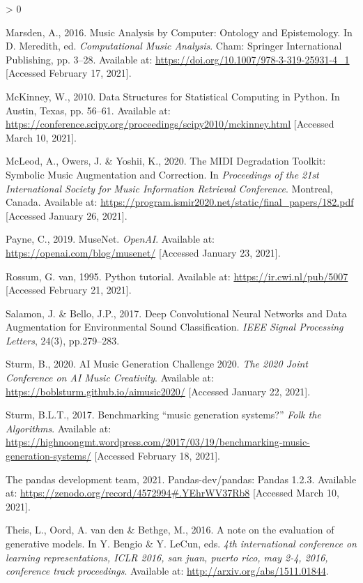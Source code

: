 \documentclass[12pt,a4paper,]{report}
\newlength{\cslhangindent}
\newenvironment{CSLReferences}[2] %
 {%
  \setlength{\parindent}{0pt}
  \ifodd #1 \everypar{\setlength{\hangindent}{\cslhangindent}}\ignorespaces\fi
  \ifnum #2 > 0
  \setlength{\parskip}{#2\baselineskip}
  \fi
 }%
 {}
\begin{document}
\begin{CSLReferences}{1}{0}
\leavevmode\hypertarget{ref-marsden_music_2016}{}%
Marsden, A., 2016. Music {Analysis} by {Computer}: {Ontology} and
{Epistemology}. In D. Meredith, ed. \emph{Computational {Music}
{Analysis}}. Cham: Springer International Publishing, pp. 3--28.
Available at: \url{https://doi.org/10.1007/978-3-319-25931-4_1}
{[}Accessed February 17, 2021{]}.

\leavevmode\hypertarget{ref-mckinney_data_2010}{}%
McKinney, W., 2010. Data {Structures} for {Statistical} {Computing} in
{Python}. In Austin, Texas, pp. 56--61. Available at:
\url{https://conference.scipy.org/proceedings/scipy2010/mckinney.html}
{[}Accessed March 10, 2021{]}.

\leavevmode\hypertarget{ref-mcleod_midi_2020}{}%
McLeod, A., Owers, J. \& Yoshii, K., 2020. The {MIDI} {Degradation}
{Toolkit}: {Symbolic} {Music} {Augmentation} and {Correction}. In
\emph{Proceedings of the 21st {International} {Society} for {Music}
{Information} {Retrieval} {Conference}}. Montreal, Canada. Available at:
\url{https://program.ismir2020.net/static/final_papers/182.pdf}
{[}Accessed January 26, 2021{]}.

\leavevmode\hypertarget{ref-payne_musenet_2019}{}%
Payne, C., 2019. {MuseNet}. \emph{OpenAI}. Available at:
\url{https://openai.com/blog/musenet/} {[}Accessed January 23, 2021{]}.

\leavevmode\hypertarget{ref-van_rossum_python_1995}{}%
Rossum, G. van, 1995. Python tutorial. Available at:
\url{https://ir.cwi.nl/pub/5007} {[}Accessed February 21, 2021{]}.

\leavevmode\hypertarget{ref-salamon_deep_2017}{}%
Salamon, J. \& Bello, J.P., 2017. Deep {Convolutional} {Neural}
{Networks} and {Data} {Augmentation} for {Environmental} {Sound}
{Classification}. \emph{IEEE Signal Processing Letters}, 24(3),
pp.279--283.

\leavevmode\hypertarget{ref-sturm_ai_2020}{}%
Sturm, B., 2020. {AI} {Music} {Generation} {Challenge} 2020. \emph{The
2020 Joint Conference on AI Music Creativity}. Available at:
\url{https://boblsturm.github.io/aimusic2020/} {[}Accessed January 22,
2021{]}.

\leavevmode\hypertarget{ref-sturm_benchmarking_2017}{}%
Sturm, B.L.T., 2017. Benchmarking {``music generation systems?''}
\emph{Folk the Algorithms}. Available at:
\url{https://highnoongmt.wordpress.com/2017/03/19/benchmarking-music-generation-systems/}
{[}Accessed February 18, 2021{]}.

\leavevmode\hypertarget{ref-pandas_software_2021}{}%
The pandas development team, 2021. Pandas-dev/pandas: {Pandas} 1.2.3.
Available at: \url{https://zenodo.org/record/4572994\#.YEhrWV37Rb8}
{[}Accessed March 10, 2021{]}.

\leavevmode\hypertarget{ref-theis_note_2016}{}%
Theis, L., Oord, A. van den \& Bethge, M., 2016. A note on the
evaluation of generative models. In Y. Bengio \& Y. LeCun, eds.
\emph{4th international conference on learning representations, {ICLR}
2016, san juan, puerto rico, may 2-4, 2016, conference track
proceedings}. Available at: \url{http://arxiv.org/abs/1511.01844}.

\end{CSLReferences}
\end{document}
